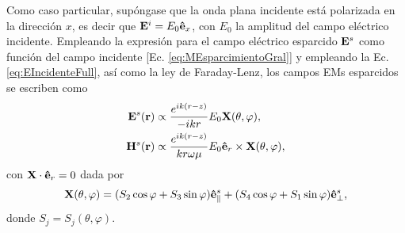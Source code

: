 Como caso particular, supóngase que la onda plana incidente está polarizada en la dirección $x$, es decir que $\vb{E}^i = E_0\vu{e}_x$, con $E_0$	 la amplitud del campo eléctrico incidente. Empleando la  expresión para el campo eléctrico esparcido $\vb{E}^s$ como función del campo incidente [Ec. \eqref{eq:MEsparcimientoGral}] y empleando la Ec. \eqref{eq:EIncidenteFull}, así como la ley de Faraday-Lenz, los campos EMs esparcidos se escriben como
%
\begin{align}
\vb{E}^s(\vb{r}) &\propto \frac{e^{ik(r-z)}}{-ikr}E_0\vb{X}(\theta,\varphi),
\label{eq:EscaX}\\
\vb{H}^s(\vb{r}) &\propto \frac{e^{ik(r-z)}}{kr\omega\mu}E_0\vu{e}_r\times\vb{X}(\theta,\varphi),
\label{eq:HscaX}
\end{align}
%
con $\vb{X}\cdot\vu{e}_r = 0$ dada por
%
\begin{align}
\vb{X}(\theta,\varphi) = (S_2\cos\varphi + S_3\sin\varphi)\vu{e}_{\parallel}^s + (S_4\cos\varphi + S_1\sin\varphi)\vu{e}_{\perp}^s,
\end{align}
%
donde $S_j = S_j(\theta,\varphi)$.

